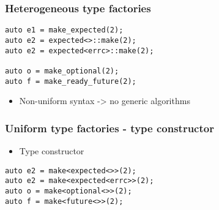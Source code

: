 \documentclass[xcolor=dvipsnames]{beamer}
\begin{document}
\begin{frame}[fragile]
\frametitle{Heterogeneous type factories}

\begin{lstlisting}
auto e1 = make_expected(2); 
auto e2 = expected<>::make(2); 
auto e2 = expected<errc>::make(2);

auto o = make_optional(2); 
auto f = make_ready_future(2); 
\end{lstlisting}

\begin{itemize}
  \item Non-uniform syntax -> no generic algorithms 
\end{itemize}

\end{frame}
\begin{frame}[fragile]
\frametitle{Uniform type factories - type constructor}

\begin{itemize}
  \item Type constructor 
\end{itemize}

\begin{lstlisting}
auto e2 = make<expected<>>(2); 
auto e2 = make<expected<errc>>(2);
auto o = make<optional<>>(2); 
auto f = make<future<>>(2); 
\end{lstlisting}
\end{frame}
\end{document}

